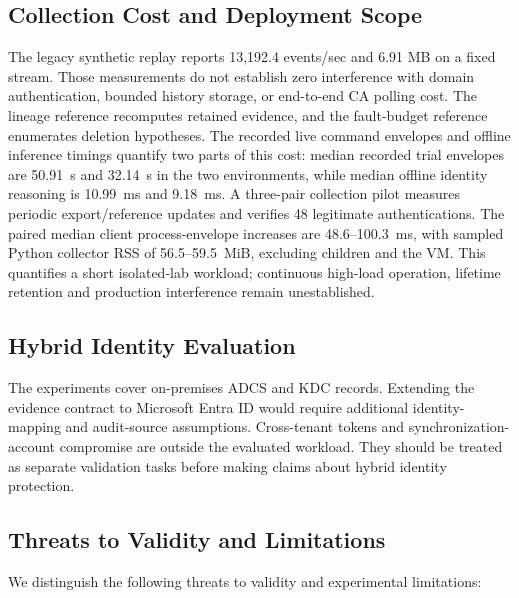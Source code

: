 \subsection{Collection Cost and Deployment Scope}
The legacy synthetic replay reports 13,192.4 events/sec and 6.91 MB on a fixed stream. Those measurements do not establish zero interference with domain authentication, bounded history storage, or end-to-end CA polling cost. The lineage reference recomputes retained evidence, and the fault-budget reference enumerates deletion hypotheses. The recorded live command envelopes and offline inference timings quantify two parts of this cost: median recorded trial envelopes are 50.91~s and 32.14~s in the two environments, while median offline identity reasoning is 10.99~ms and 9.18~ms. A three-pair collection pilot measures periodic export/reference updates and verifies 48 legitimate authentications. The paired median client process-envelope increases are 48.6--100.3~ms, with sampled Python collector RSS of 56.5--59.5~MiB, excluding children and the VM. This quantifies a short isolated-lab workload; continuous high-load operation, lifetime retention and production interference remain unestablished.

\subsection{Hybrid Identity Evaluation}
The experiments cover on-premises ADCS and KDC records. Extending the evidence contract to Microsoft Entra ID would require additional identity-mapping and audit-source assumptions. Cross-tenant tokens and synchronization-account compromise are outside the evaluated workload. They should be treated as separate validation tasks before making claims about hybrid identity protection.

\subsection{Threats to Validity and Limitations}
We distinguish the following threats to validity and experimental limitations:
